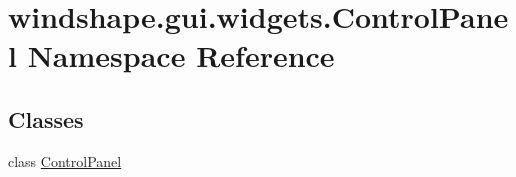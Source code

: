 \hypertarget{namespacewindshape_1_1gui_1_1widgets_1_1_control_panel}{}\section{windshape.\+gui.\+widgets.\+Control\+Panel Namespace Reference}
\label{namespacewindshape_1_1gui_1_1widgets_1_1_control_panel}
\subsection*{Classes}
\begin{DoxyCompactItemize}
\item 
class \mbox{\hyperlink{classwindshape_1_1gui_1_1widgets_1_1_control_panel_1_1_control_panel}{Control\+Panel}}
\end{DoxyCompactItemize}
